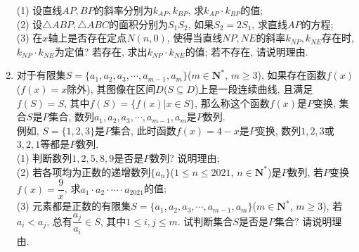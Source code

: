 \documentclass[10pt,a4paper]{article}
\begin{document}
\begin{enumerate}[1.]
\begin{center}
\end{center}
(1) 设直线$AP,BP$的斜率分别为$k_{AP},k_{BP}$, 求$k_{AP}\cdot k_{BP}$的值;\\
(2) 设$\triangle ABP, \triangle ABC$的面积分别为$S_1S_2$, 如果$S_2=2S_1$, 求直线$AP$的方程;\\
(3) 在$x$轴上是否存在定点$N(n,0)$, 使得当直线$NP,NE$的斜率$k_{NP},k_{NE}$存在时, $k_{NP}\cdot k_{NE}$为定值? 若存在, 求出$k_{NP}\cdot k_{NE}$的值; 若不存在, 请说明理由.
\item 对于有限集$S=\{a_1,a_2,a_3,\cdots ,a_{m-1},a_m\}$($m\in \mathbf{N}^*$, $m\ge 3$), 如果存在函数$f(x)$($f(x)=x$除外), 其图像在区间$D$($S\subseteq D$)上是一段连续曲线, 且满足$f(S)=S$, 其中$f(S)=\{f(x)|x \in S\}$, 那么称这个函数$f(x)$是$P$变换, 集合$S$是$P$集合, 数列$a_1,a_2,a_3,\cdots ,a_{m-1},a_m$是$P$数列.\\
例如, $S=\{1,2,3\}$是$P$集合, 此时函数$f(x)=4-x$是$P$变换, 数列$1,2,3$或$3,2,1$等都是$P$数列.\\
(1) 判断数列$1,2,5,8,9$是否是$P$数列? 说明理由;\\
(2) 若各项均为正数的递增数列$\{a_n\}$($1\le n\le 2021$, $n\in \mathbf{N}^*$)是$P$数列, 若$P$变换$f(x)=\dfrac 9x$, 求$a_1\cdot a_2\cdot \cdots \cdot a_{2021}$的值;\\
(3) 元素都是正数的有限集$S=\{a_1,a_2,a_3,\cdots ,a_{m-1},a_m\}$($m\in \mathbf{N}^*$, $m\ge 3$), 若$a_i<a_j$, 总有$\dfrac{a_j}{a_i}\in S$, 其中$1\le i,j\le m$. 试判断集合$S$是否是$P$集合? 请说明理由.


\end{enumerate}
\end{document}
